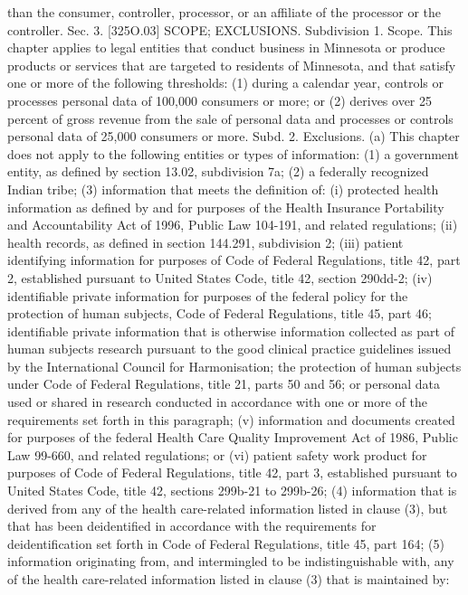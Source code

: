 than the consumer, controller, processor, or an affiliate of the processor or the controller.
Sec. 3. [325O.03] SCOPE; EXCLUSIONS.
Subdivision 1. Scope. This chapter applies to legal entities that conduct business in
Minnesota or produce products or services that are targeted to residents of Minnesota, and
that satisfy one or more of the following thresholds:
(1) during a calendar year, controls or processes personal data of 100,000 consumers or
more; or
(2) derives over 25 percent of gross revenue from the sale of personal data and processes
or controls personal data of 25,000 consumers or more.
Subd. 2. Exclusions. (a) This chapter does not apply to the following entities or types
of information:
(1) a government entity, as defined by section 13.02, subdivision 7a;
(2) a federally recognized Indian tribe;
(3) information that meets the definition of:
(i) protected health information as defined by and for purposes of the Health Insurance
Portability and Accountability Act of 1996, Public Law 104-191, and related regulations;
(ii) health records, as defined in section 144.291, subdivision 2;
(iii) patient identifying information for purposes of Code of Federal Regulations, title
42, part 2, established pursuant to United States Code, title 42, section 290dd-2;
(iv) identifiable private information for purposes of the federal policy for the protection
of human subjects, Code of Federal Regulations, title 45, part 46; identifiable private
information that is otherwise information collected as part of human subjects research
pursuant to the good clinical practice guidelines issued by the International Council for
Harmonisation; the protection of human subjects under Code of Federal Regulations, title
21, parts 50 and 56; or personal data used or shared in research conducted in accordance
with one or more of the requirements set forth in this paragraph;
(v) information and documents created for purposes of the federal Health Care Quality
Improvement Act of 1986, Public Law 99-660, and related regulations; or
(vi) patient safety work product for purposes of Code of Federal Regulations, title 42,
part 3, established pursuant to United States Code, title 42, sections 299b-21 to 299b-26;
(4) information that is derived from any of the health care-related information listed in
clause (3), but that has been deidentified in accordance with the requirements for
deidentification set forth in Code of Federal Regulations, title 45, part 164;
(5) information originating from, and intermingled to be indistinguishable with, any of
the health care-related information listed in clause (3) that is maintained by:
